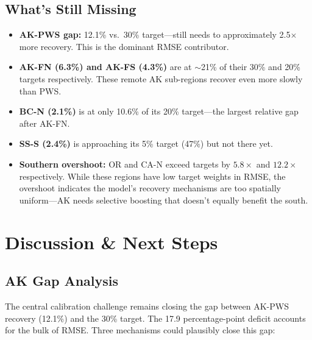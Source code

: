\documentclass[11pt,a4paper]{article}
\begin{document}
\subsection{What's Still Missing}

\begin{itemize}[leftmargin=*]
    \item \textbf{AK-PWS gap:} 12.1\% vs.\ 30\% target---still needs to approximately 2.5$\times$ more recovery. This is the dominant RMSE contributor.
    \item \textbf{AK-FN (6.3\%) and AK-FS (4.3\%)} are at $\sim$21\% of their 30\% and 20\% targets respectively. These remote AK sub-regions recover even more slowly than PWS.
    \item \textbf{BC-N (2.1\%)} is at only 10.6\% of its 20\% target---the largest relative gap after AK-FN.
    \item \textbf{SS-S (2.4\%)} is approaching its 5\% target (47\%) but not there yet.
    \item \textbf{Southern overshoot:} OR and CA-N exceed targets by $5.8\times$ and $12.2\times$ respectively. While these regions have low target weights in RMSE, the overshoot indicates the model's recovery mechanisms are too spatially uniform---AK needs selective boosting that doesn't equally benefit the south.
\end{itemize}

\section{Discussion \& Next Steps}

\subsection{AK Gap Analysis}

The central calibration challenge remains closing the gap between AK-PWS recovery (12.1\%) and the 30\% target. The 17.9 percentage-point deficit accounts for the bulk of RMSE. Three mechanisms could plausibly close this gap:
\end{document}
